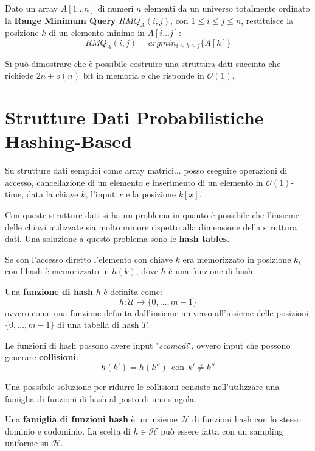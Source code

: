 \begin{definizione}
    Dato un array $A[1\dots n]$ di numeri $n$ elementi da un universo totalmente ordinato la \textbf{Range Minimum Query} $RMQ_A(i, j)$, con $1 \leq i \leq j \leq n$, restituisce la posizione $k$ di un elemento minimo in $A[i \dots j]$:$$RMQ_A(i, j) = argmin_{i \leq k \leq j}\{A[k]\}$$

    Si può dimostrare che è possibile costruire una struttura dati succinta che richiede $2n + o(n)$ bit in memoria e che risponde in $\mathcal{O}(1)$. 
\end{definizione}
\chapter{Strutture Dati Probabilistiche Hashing-Based}
Su strutture dati semplici come array matrici$\dots$ posso eseguire operazioni di accesso, cancellazione di un elemento e inserimento di un elemento in $\mathcal{O}(1)$-time, data la chiave $k$, l'input $x$ e la posizione $k[x]$.

Con queste strutture dati si ha un problema in quanto è possibile che l'insieme delle chiavi utilizzate sia molto minore rispetto alla dimensione della struttura dati. Una soluzione a questo problema sono le \textbf{hash tables}.

Se con l'accesso diretto l'elemento con chiave $k$ era memorizzato in posizione $k$, con l'hash è memorizzato in $h(k)$, dove $h$ è una funzione di hash.
\begin{definizione}
    Una \textbf{funzione di hash} $h$ è definita come:
    \begin{equation}
        h: \mathcal{U} \to \{0, \dots, m - 1\}
    \end{equation}
    ovvero come una funzione definita dall'insieme universo all'insieme delle posizioni $\{0, \dots, m - 1\}$ di una tabella di hash $T$.
\end{definizione}

Le funzioni di hash possono avere input "\textit{scomodi}", ovvero input che possono generare \textbf{collisioni}:
\begin{equation}
    h(k') = h(k'') \ \ \text{con} \ \ k' \neq k''
\end{equation}

Una possibile soluzione per ridurre le collisioni consiste nell'utilizzare una famiglia di funzioni di hash al posto di una singola.
\begin{definizione}
    Una \textbf{famiglia di funzioni hash} è un insieme $\mathcal{H}$ di funzioni hash con lo stesso dominio e codominio. La scelta di $h \in \mathcal{H}$ può essere fatta con un sampling uniforme su $\mathcal{H}$.
\end{definizione}

